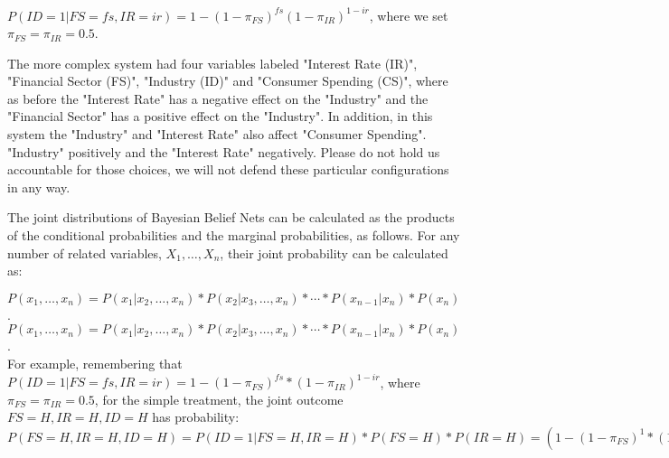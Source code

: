 $P(ID=1|FS=fs, IR=ir) = 1-(1-\pi_{FS})^{fs}(1-\pi_{IR})^{1-ir}$, where we set $\pi_{FS}=\pi_{IR}=0.5$. 


The more complex system had four variables labeled "Interest Rate (IR)", "Financial Sector (FS)", "Industry (ID)" and "Consumer Spending (CS)", where as before the "Interest Rate" has a negative effect on the "Industry" and the "Financial Sector" has a positive effect on the "Industry". In addition, in this system the "Industry" and "Interest Rate" also affect "Consumer Spending". "Industry" positively and the "Interest Rate" negatively.  Please do not hold us accountable for those choices, we will not defend these particular configurations in any way.

The joint distributions of Bayesian Belief Nets can be calculated as the products of the conditional probabilities and the marginal probabilities, as follows. For any number of related variables, $X_1, \ldots, X_n$, their joint probability can be calculated as:

$P(x_1, \ldots, x_n) = P(x_1 | x_2, \ldots, x_n)*P(x_2 | x_3, \ldots, x_n)*\cdots*P(x_{n-1} |x_n)*P(x_n)$.
\\

$P(x_1, \ldots, x_n) = P(x_1 | x_2, \ldots, x_n)*P(x_2 | x_3, \ldots, x_n)*\cdots*P(x_{n-1} |x_n)*P(x_n)$.
\\

For example, remembering that $P(ID=1|FS=fs, IR=ir) = 1-(1-\pi_{FS})^{fs}*(1-\pi_{IR})^{1-ir}$, where $\pi_{FS}=\pi_{IR}=0.5$, for the simple treatment, the joint outcome $FS=H, IR=H, ID=H$ has probability:
\\

$P(FS=H, IR=H, ID=H) = P(ID=1|FS=H, IR=H)*P(FS=H)*P(IR=H)=\left(1-(1-\pi_{FS})^{1}*(1-\pi_{IR})^{1-1}\right)*0.5^2 =0.125.$  
\\

